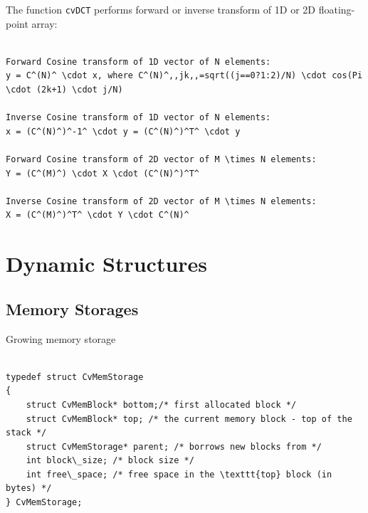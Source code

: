 \begin{description}
\end{description}

The function \texttt{cvDCT} performs forward or inverse transform of 1D or 2D floating-point array:

\begin{lstlisting}

Forward Cosine transform of 1D vector of N elements:
y = C^(N)^ \cdot x, where C^(N)^,,jk,,=sqrt((j==0?1:2)/N) \cdot cos(Pi \cdot (2k+1) \cdot j/N)

Inverse Cosine transform of 1D vector of N elements:
x = (C^(N)^)^-1^ \cdot y = (C^(N)^)^T^ \cdot y

Forward Cosine transform of 2D vector of M \times N elements:
Y = (C^(M)^) \cdot X \cdot (C^(N)^)^T^

Inverse Cosine transform of 2D vector of M \times N elements:
X = (C^(M)^)^T^ \cdot Y \cdot C^(N)^

\end{lstlisting}


\section{Dynamic Structures}

\subsection{Memory Storages}

\label{CvMemStorage}

Growing memory storage

\begin{lstlisting}

typedef struct CvMemStorage
{
    struct CvMemBlock* bottom;/* first allocated block */
    struct CvMemBlock* top; /* the current memory block - top of the stack */
    struct CvMemStorage* parent; /* borrows new blocks from */
    int block\_size; /* block size */
    int free\_space; /* free space in the \texttt{top} block (in bytes) */
} CvMemStorage;

\end{lstlisting}

